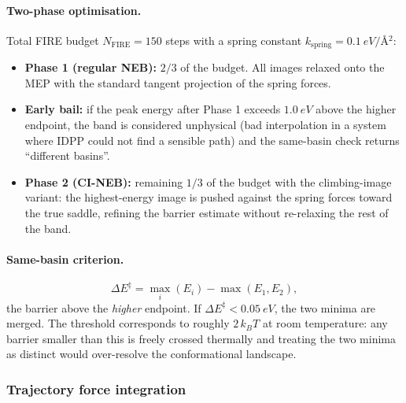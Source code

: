 \paragraph{Two-phase optimisation.}
Total FIRE budget $N_\text{FIRE} = 150$ steps with a spring constant $k_\text{spring} = \SI{0.1}{eV/\angstrom^2}$:
\begin{itemize}
    \item \textbf{Phase 1 (regular NEB):} $2/3$ of the budget. All images relaxed onto the MEP with the standard tangent projection of the spring forces.
    \item \textbf{Early bail:} if the peak energy after Phase 1 exceeds $\SI{1.0}{eV}$ above the higher endpoint, the band is considered unphysical (bad interpolation in a system where IDPP could not find a sensible path) and the same-basin check returns ``different basins''.
    \item \textbf{Phase 2 (CI-NEB):} remaining $1/3$ of the budget with the climbing-image variant: the highest-energy image is pushed against the spring forces toward the true saddle, refining the barrier estimate without re-relaxing the rest of the band.
\end{itemize}

\paragraph{Same-basin criterion.}
\begin{equation}
    \Delta E^\ddagger = \max_i(E_i) - \max(E_1, E_2),
\end{equation}
the barrier above the \emph{higher} endpoint. If $\Delta E^\ddagger < \SI{0.05}{eV}$, the two minima are merged. The threshold corresponds to roughly $2\,k_B T$ at room temperature: any barrier smaller than this is freely crossed thermally and treating the two minima as distinct would over-resolve the conformational landscape.


\subsubsection{Trajectory force integration}
\label{sec:shared-traj}

